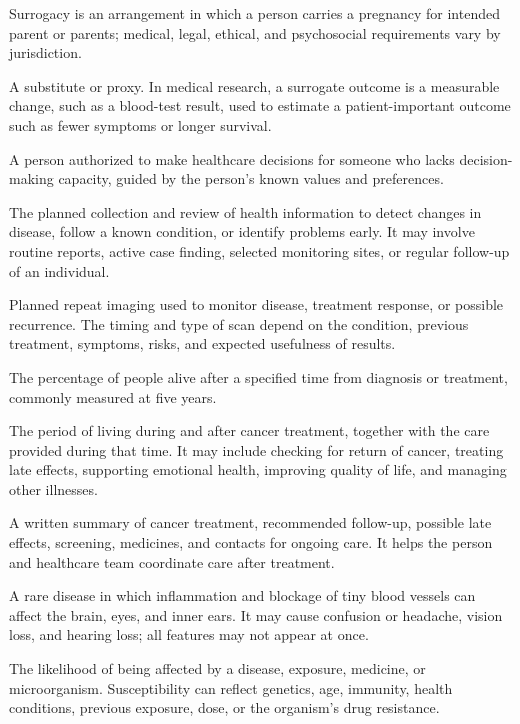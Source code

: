  Surrogacy is an arrangement in which a person carries a pregnancy for intended parent or parents; medical, legal, ethical, and psychosocial requirements vary by jurisdiction.

 A substitute or proxy. In medical research, a surrogate outcome is a measurable change, such as a blood-test result, used to estimate a patient-important outcome such as fewer symptoms or longer survival.

 A person authorized to make healthcare decisions for someone who lacks decision-making capacity, guided by the person's
known values and preferences.

 The planned collection and review of health information to detect changes in disease, follow a known condition, or identify problems early. It may involve routine reports, active case finding, selected monitoring sites, or regular follow-up of an individual.

 Planned repeat imaging used to monitor disease, treatment response, or possible recurrence. The timing and type of scan depend on the condition, previous treatment, symptoms, risks, and expected usefulness of results.

 The percentage of people alive after a specified time from diagnosis or treatment, commonly measured at five years.

 The period of living during and after cancer treatment, together with the care provided during that time. It may include checking for return of cancer, treating late effects, supporting emotional health, improving quality of life, and managing other illnesses.

 A written summary of cancer treatment, recommended follow-up, possible late effects, screening, medicines, and contacts for ongoing care. It helps the person and healthcare team coordinate care after treatment.

 A rare disease in which inflammation and blockage of tiny blood vessels can affect the brain, eyes, and inner ears. It may cause confusion or headache, vision loss, and hearing loss; all features may not appear at once.

 The likelihood of being affected by a disease, exposure, medicine, or microorganism. Susceptibility can reflect genetics, age, immunity, health conditions, previous exposure, dose, or the organism’s drug resistance.

